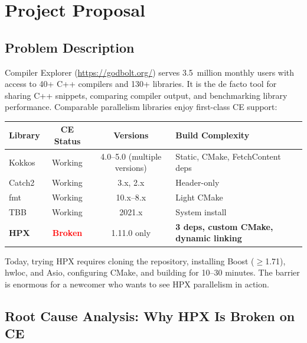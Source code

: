 \documentclass[11pt, a4paper]{article}
\begin{document}
\section*{Project Proposal}

\subsection*{Problem Description}

Compiler Explorer (\url{https://godbolt.org/}) serves 3.5~million monthly
users with access to 40+ C++ compilers and 130+ libraries.  It is the de
facto tool for sharing C++ snippets, comparing compiler output, and
benchmarking library performance.  Comparable parallelism libraries enjoy
first-class CE support:

\begin{table}[H]
\centering\small
\begin{tabularx}{\linewidth}{@{}lccX@{}}
\toprule
\textbf{Library} & \textbf{CE Status} & \textbf{Versions}
  & \textbf{Build Complexity} \\
\midrule
\rowcolor{rowgray}
Kokkos   & \textcolor{merged}{Working} & 4.0--5.0 (multiple versions)
  & Static, CMake, FetchContent deps \\
Catch2   & \textcolor{merged}{Working} & 3.x, 2.x & Header-only \\
\rowcolor{rowgray}
fmt      & \textcolor{merged}{Working} & 10.x--8.x & Light CMake \\
TBB      & \textcolor{merged}{Working} & 2021.x  & System install \\
\rowcolor{rowgray}
\textbf{HPX} & \textcolor{red}{\bfseries Broken} & 1.11.0 only
  & \textbf{3 deps, custom CMake, dynamic linking} \\
\bottomrule
\end{tabularx}
\end{table}

Today, trying HPX requires cloning the repository, installing Boost ($\geq$1.71),
hwloc, and Asio, configuring CMake, and building for 10--30 minutes.  The
barrier is enormous for a newcomer who wants to see HPX parallelism in action.

\subsection*{Root Cause Analysis: Why HPX Is Broken on CE}
\end{document}
